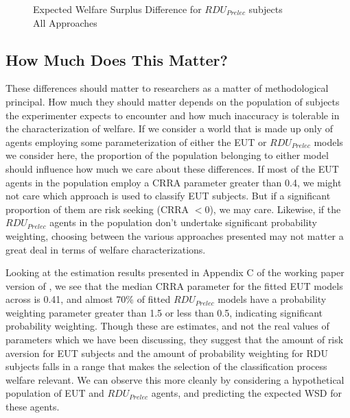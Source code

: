 \documentclass[../main.tex]{subfiles}
\begin{document}
\begin{figure}[h!]
	\center
	\caption{Expected Welfare Surplus Difference for $\mathit{RDU_{Prelec}}$ subjects\\All Approaches}
	\label{fig:exwel-pre}
\end{figure}

\subsection{How Much Does This Matter?}

These differences should matter to researchers as a matter of methodological principal.
How much they should matter depends on the population of subjects the experimenter expects to encounter and how much inaccuracy is tolerable in the characterization of welfare.
If we consider a world that is made up only of agents employing some parameterization of either the EUT or $\mathit{RDU_{Prelec}}$ models we consider here, the proportion of the population belonging to either model should influence how much we care about these differences.
If most of the EUT agents in the population employ a CRRA parameter greater than 0.4, we might not care which approach is used to classify EUT subjects.
But if a significant proportion of them are risk seeking (CRRA $< 0$), we may care.
Likewise, if the $\mathit{RDU_{Prelec}}$ agents in the population don't undertake significant probability weighting, choosing between the various approaches presented may not matter a great deal in terms of welfare characterizations.

Looking at the estimation results presented in Appendix C of the working paper version of \textcite{Harrison2016}, we see that the median CRRA parameter for the fitted EUT models across is 0.41, and almost 70\% of fitted $\mathit{RDU_{Prelec}}$ models have a probability weighting parameter greater than 1.5 or less than 0.5, indicating significant probability weighting.
Though these are estimates, and not the real values of parameters which we have been discussing, they suggest that the amount of risk aversion for EUT subjects and the amount of probability weighting for RDU subjects falls in a range that makes the selection of the classification process welfare relevant.
We can observe this more cleanly by considering a hypothetical population of EUT and $\mathit{RDU_{Prelec}}$ agents, and predicting the expected WSD for these agents.
\end{document}
